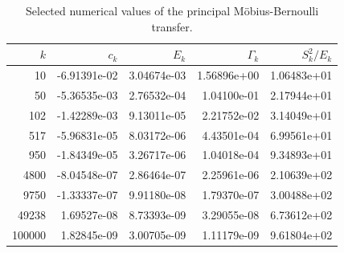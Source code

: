 \begin{table}[htbp]
\centering
\small
\caption{Selected numerical values of the principal Möbius-Bernoulli transfer.}
\label{tab:mobius-samples}
\begin{tabular}{rrrrr}
\toprule
$k$ & $c_k$ & $E_k$ & $\Gamma_k$ & $S_k^2/E_k$\\
\midrule
10 & -6.91391e-02 & 3.04674e-03 & 1.56896e+00 & 1.06483e+01\\
50 & -5.36535e-03 & 2.76532e-04 & 1.04100e-01 & 2.17944e+01\\
102 & -1.42289e-03 & 9.13011e-05 & 2.21752e-02 & 3.14049e+01\\
517 & -5.96831e-05 & 8.03172e-06 & 4.43501e-04 & 6.99561e+01\\
950 & -1.84349e-05 & 3.26717e-06 & 1.04018e-04 & 9.34893e+01\\
4800 & -8.04548e-07 & 2.86464e-07 & 2.25961e-06 & 2.10639e+02\\
9750 & -1.33337e-07 & 9.91180e-08 & 1.79370e-07 & 3.00488e+02\\
49238 & 1.69527e-08 & 8.73393e-09 & 3.29055e-08 & 6.73612e+02\\
100000 & 1.82845e-09 & 3.00705e-09 & 1.11179e-09 & 9.61804e+02\\
\bottomrule
\end{tabular}
\end{table}
